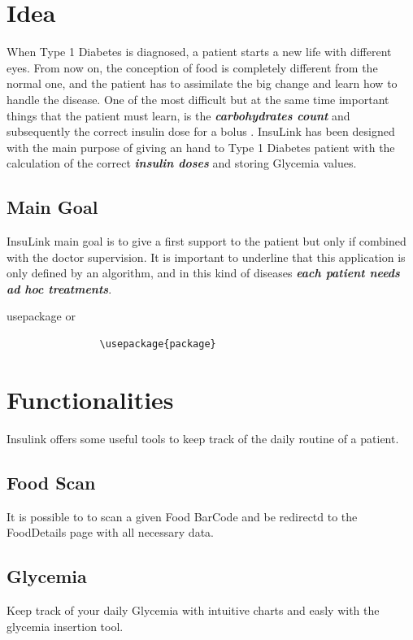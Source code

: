 \documentclass[12pt,hidelinks]{article}
\begin{document}
\section{Idea}
\vspace{10.5cm}
When Type 1 Diabetes\cite{Type 1 Diabetes} is diagnosed, a patient starts a new life with different eyes. From now on, the conception of food is completely different
from the normal one, and the patient has to assimilate the big change and learn how to handle the disease. 
One of the most difficult but at the same time important things that the patient must learn, is the \textbf{\emph{carbohydrates count}} and subsequently the correct insulin dose for a bolus \cite{Bolus}.
InsuLink has been designed with the main purpose of giving an hand to Type 1 Diabetes patient with the calculation of the correct \textbf{\emph{insulin doses}} and  storing Glycemia values.
	\subsection{Main Goal}
    InsuLink main goal is to give a first support to the patient but only if combined with the doctor supervision. It is important to underline
	that this application is only defined by an algorithm, and in this kind of diseases \textbf{\emph{each patient 
	needs ad hoc treatments}}.

		\begin{docCommand}{usepackage}{}
			or
			\begin{verbatim}
				\usepackage{package}
			\end{verbatim}
		\end{docCommand}
	\vspace{-1.5mm}
\newpage
\section{Functionalities}
\vspace{10.5cm}
Insulink offers some useful tools to keep track of the daily routine of a patient. 
	\subsection{Food Scan}	
	It is possible to to scan a given Food BarCode and be redirectd to the FoodDetails page with all necessary data.
	\subsection{Glycemia}
    Keep track of your daily Glycemia with intuitive charts and easly with the glycemia insertion tool.
\end{document}
